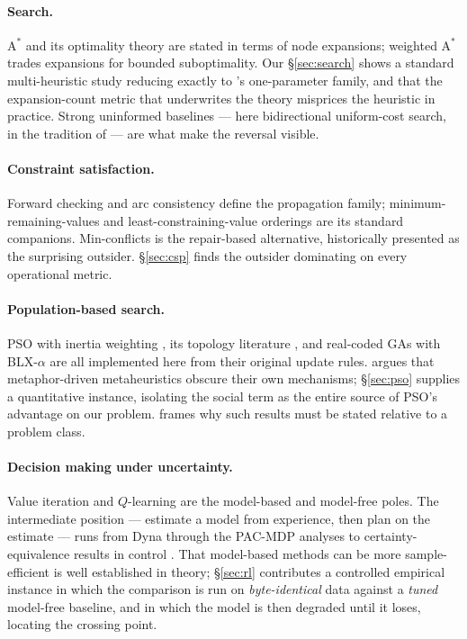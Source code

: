 \documentclass[11pt]{article}
\begin{document}
\paragraph{Search.} $\mathrm{A}^*$ \citep{hart1968formal} and its optimality theory
\citep{dechter1985generalized, pearl1984heuristics} are stated in terms of node expansions;
weighted $\mathrm{A}^*$ \citep{pohl1970heuristic} trades expansions for bounded suboptimality.
Our \S\ref{sec:search} shows a standard multi-heuristic study reducing exactly to
\citeauthor{pohl1970heuristic}'s one-parameter family, and that the expansion-count metric that
underwrites the theory misprices the heuristic in practice. Strong uninformed baselines --- here
bidirectional uniform-cost search, in the tradition of \citet{holte2016bidirectional} --- are what
make the reversal visible.

\paragraph{Constraint satisfaction.} Forward checking \citep{haralick1980increasing} and arc
consistency \citep{mackworth1977consistency} define the propagation family; minimum-remaining-values
and least-constraining-value orderings are its standard companions. Min-conflicts
\citep{minton1992minimizing} is the repair-based alternative, historically presented as the
surprising outsider. \S\ref{sec:csp} finds the outsider dominating on every operational metric.

\paragraph{Population-based search.} PSO \citep{kennedy1995particle} with inertia weighting
\citep{shi1998modified}, its topology literature \citep{kennedy2002population}, and real-coded GAs
with BLX-$\alpha$ \citep{eshelman1993real} are all implemented here from their original update
rules. \citet{sorensen2015metaheuristics} argues that metaphor-driven metaheuristics obscure their
own mechanisms; \S\ref{sec:pso} supplies a quantitative instance, isolating the social term as the
entire source of PSO's advantage on our problem. \citet{wolpert1997no} frames why such results must
be stated relative to a problem class.

\paragraph{Decision making under uncertainty.} Value iteration \citep{bellman1957dynamic,
puterman1994markov} and $Q$-learning \citep{watkins1992qlearning, sutton2018reinforcement} are the
model-based and model-free poles. The intermediate position --- estimate a model from experience,
then plan on the estimate --- runs from Dyna \citep{sutton1990integrated} through the PAC-MDP
analyses \citep{kearns2002near, brafman2002rmax} to certainty-equivalence results in control
\citep{mania2019certainty}. That model-based methods can be more sample-efficient is well
established in theory; \S\ref{sec:rl} contributes a controlled empirical instance in which the
comparison is run on \emph{byte-identical} data against a \emph{tuned} model-free baseline, and in
which the model is then degraded until it loses, locating the crossing point.
\end{document}

